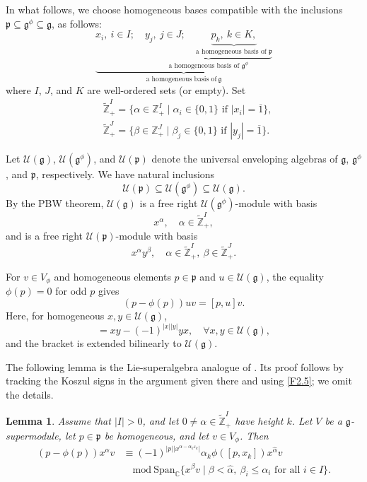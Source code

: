 \documentclass[12pt,reqno]{article}
\newtheorem{lem}[thm]{Lemma}
\def\o{\overline}
\def\a{\alpha}
\def\b{\beta}
\def\F{\mathfrak}
\def\r{\mathrm}
\def\C{\mathcal}
\def\CC{\mathbb{C}}
\def\ZZ{\mathbb{Z}}
\def\beqn{\begin{equation*}}
\def\eeqn{\end{equation*}}
\def\beq{\begin{equation}}
\def\eeq{\end{equation}}
\def\({\left(}
\def\){\right)}
\begin{document}
In what follows, we choose homogeneous bases compatible with the inclusions $\F{p}\subseteq\F{g}^\phi\subseteq\F{g}$, as follows:
\beq\label{F2.3}
\underbrace{x_i, ~i\in I;\quad \underbrace{y_j, ~j\in J;\quad\underbrace{p_k, ~k\in K, }_{\text{a homogeneous basis of }\F{p}}}_{\text{a homogeneous basis of }\F{g}^{\phi}}}_{\text{a homogeneous basis of} ~\F{g}}
\eeq
where $I$, $J$, and $K$ are well-ordered sets (or empty).
Set
\begin{align*}
	&\widetilde{\ZZ}_{+}^{I}=\{\a\in\ZZ_+^I\mid\a_i\in\{0,1\}\text{ if }|x_i|=\o{1}\},\\
	&\widetilde{\ZZ}_{+}^{J}=\{\b\in\ZZ_+^J\mid\b_j\in\{0,1\}\text{ if }|y_j|=\o{1}\}.
\end{align*}

Let $\C{U}(\F{g})$, $\C{U}(\F{g}^{\phi})$, and $\C{U}(\F{p})$ denote the universal enveloping algebras of $\F{g}$, $\F{g}^{\phi}$, and $\F{p}$, respectively. We have natural inclusions
\beq\label{F2.4}
\C{U}(\F{p})\subseteq \C{U}(\F{g}^{\phi})\subseteq \C{U}(\F{g}).
\eeq
By the PBW theorem, $\C{U}(\F{g})$ is a free right $\C{U}(\F{g}^{\phi})$-module with basis
\beqn
x^{\a}, \quad \a\in\widetilde{\ZZ}_+^I, 
\eeqn
and is a free right $\C{U}(\F{p})$-module with basis
\beqn
x^\a y^{\b}, \quad \a\in\widetilde{\ZZ}_+^I, ~\b\in\widetilde{\ZZ}_+^J.
\eeqn


For $v\in V_{\phi}$ and homogeneous elements $p\in\F{p}$ and $u\in\C{U}(\F{g})$, the equality $\phi(p)=0$ for odd $p$ gives
\beq\label{F2.5}
\(p-\phi(p)\)uv=[p,u]v.
\eeq
Here, for homogeneous $x,y\in\C{U}(\F{g})$,  
\beqn
[x, y]=xy-(-1)^{|x||y|}yx, \quad\forall x, y\in \C{U}(\F{g}),
\eeqn
and the bracket is extended bilinearly to $\C{U}(\F{g})$.


The following lemma is the Lie-superalgebra analogue of \cite[Lemma 2.4]{CGLZZ}. Its proof follows by tracking the Koszul signs in the argument given there and using \eqref{F2.5}; we omit the details.

\begin{lem}\label{L2.4}
Assume that $|I|>0$, and let $0\neq\a\in\widetilde{\ZZ}_+^I$ have height $k$. Let $V$ be a $\F{g}$-supermodule, let $p\in\F{p}$ be homogeneous, and let $v\in V_{\phi}$. Then
\beqn
\begin{aligned}
(p-\phi(p))x^\a v
&\equiv(-1)^{|p|\left|x^{\a-\a_k\varepsilon_k}\right|}
\a_k\phi([p,x_k])x^{\hat\a}v\\
&\quad \r{mod}~\r{Span}_{\CC}
\{x^\b v\mid \b<\hat\a,~\b_i\leq\a_i\text{ for all }i\in I\}.
\end{aligned}
\eeqn	
\end{lem}
\end{document}
